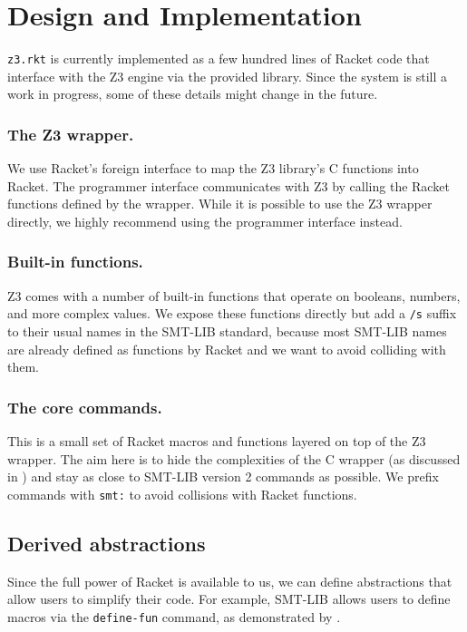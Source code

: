 \section{Design and Implementation}
\label{sec:design-impl}

\texttt{z3.rkt} is currently implemented as a few hundred lines of Racket code
that interface with the Z3 engine via the provided library. Since the system is
still a work in progress, some of these details might change in the future.

\subsubsection{The Z3 wrapper.} We use Racket's foreign interface \cite{racket/foreign}
to map the Z3 library's C functions into Racket. The programmer interface
communicates with Z3 by calling the Racket functions defined by the
wrapper. While it is possible to use the Z3 wrapper directly, we highly
recommend using the programmer interface instead.

\subsubsection{Built-in functions.} Z3 comes with a number of built-in functions that
operate on booleans, numbers, and more complex values. We expose these
functions directly but add a \texttt{/s} suffix to their usual names in the
SMT-LIB standard, because most SMT-LIB names are already defined as functions
by Racket and we want to avoid colliding with them.

\subsubsection{The core commands.} This is a small set of Racket macros and
functions layered on top of the Z3 wrapper. The aim here is to hide the
complexities of the C wrapper (as discussed in ) and
stay as close to SMT-LIB version 2 commands \cite{smtlib2:10} as possible. We
prefix commands with \texttt{smt:} to avoid collisions with Racket functions.

\subsection{Derived abstractions}
\label{sec:derived}

Since the full power of Racket is available to us, we can define abstractions
that allow users to simplify their code. For example, SMT-LIB allows users to
define macros via the \texttt{define-fun} command, as demonstrated by
.

